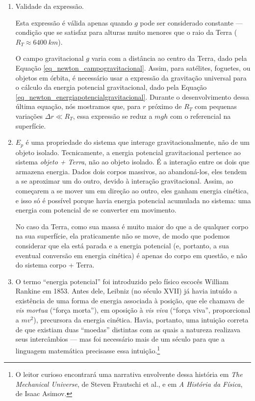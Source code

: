 \begin{enumerate}
    
    \item [(i)] Validade da expressão.

    Esta expressão é válida
  apenas quando $g$ pode ser considerado constante --- condição que se
  satisfaz para alturas muito menores que o raio da Terra
  ($R_T \approx \SI{6400}{km}$).
  
  O campo gravitacional $g$ varia com a distância ao centro da Terra, dado pela Equação \eqref{eq_newton_campogravitacional}. Assim, para satélites, foguetes, ou objetos
  em órbita, é necessário usar a expressão da gravitação universal para o cálculo da energia potencial gravitacional, dado pela Equação \eqref{eq_newton_energiapotencialgravitacional}. Durante o desenvolvimento dessa última equação, nós mostramos que, para $r$ próximo de $R_T$ com pequenas
  variações $\Delta r \ll R_T$, essa expressão se reduz a $mgh$ com o
  referencial na superfície.


    \item [(ii)] $E_p$ é uma propriedade do sistema que interage gravitacionalmente, não de um objeto isolado. Tecnicamente, a energia potencial gravitacional pertence ao sistema
  \emph{objeto + Terra}, não ao objeto isolado. É a interação entre os
  dois que armazena energia. Dados dois corpos massivos, ao abandoná-los, eles tendem a se aproximar um do outro, devido à interação gravitacional. Assim, ao começarem a se mover um em direção ao outro, eles ganham energia cinética, e isso só é possível porque havia energia potencial acumulada no sistema: uma energia com potencial de se converter em movimento.

No caso da Terra, como sua massa é muito maior do que a de qualquer corpo na sua superfície, ela praticamente não se move, de modo que podemos considerar que ela está parada e a energia potencial (e, portanto, a sua eventual conversão em energia cinética) é apenas do corpo em questão, e não do sistema corpo + Terra.
  
  



    \item [(iii)]  O termo ``energia potencial''
  foi introduzido pelo físico escocês William Rankine em 1853. Antes
  dele, Leibniz (no século XVII) já havia intuído a existência de uma
  forma de energia associada à posição, que ele chamava de
  \textit{vis mortua} (``força morta''), em oposição à \textit{vis
  viva} (``força viva'', proporcional a $mv^2$), precursora da energia
  cinética. Havia, portanto, uma intuição correta de que existiam duas
  ``moedas'' distintas com as quais a natureza realizava seus
  intercâmbios --- mas foi necessário mais de um século para que a
  linguagem matemática precisasse essa intuição.\footnote{O leitor
  curioso encontrará uma narrativa envolvente dessa história em
  \textit{The Mechanical Universe}, de Steven Frautschi et al., e
  em \textit{A História da Física}, de Isaac Asimov.}
    
\end{enumerate}




